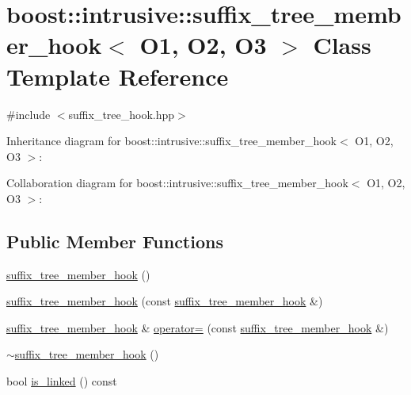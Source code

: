 \hypertarget{classboost_1_1intrusive_1_1suffix__tree__member__hook}{}\section{boost\+:\+:intrusive\+:\+:suffix\+\_\+tree\+\_\+member\+\_\+hook$<$ O1, O2, O3 $>$ Class Template Reference}
\label{classboost_1_1intrusive_1_1suffix__tree__member__hook}


{\ttfamily \#include $<$suffix\+\_\+tree\+\_\+hook.\+hpp$>$}



Inheritance diagram for boost\+:\+:intrusive\+:\+:suffix\+\_\+tree\+\_\+member\+\_\+hook$<$ O1, O2, O3 $>$\+:


Collaboration diagram for boost\+:\+:intrusive\+:\+:suffix\+\_\+tree\+\_\+member\+\_\+hook$<$ O1, O2, O3 $>$\+:
\subsection*{Public Member Functions}
\begin{DoxyCompactItemize}
\item 
\hyperlink{classboost_1_1intrusive_1_1suffix__tree__member__hook_ab13f7e7c4cf841123d772121aeac5e0d}{suffix\+\_\+tree\+\_\+member\+\_\+hook} ()
\item 
\hyperlink{classboost_1_1intrusive_1_1suffix__tree__member__hook_abd901fd867e5b045ead9d2d8eddc8578}{suffix\+\_\+tree\+\_\+member\+\_\+hook} (const \hyperlink{classboost_1_1intrusive_1_1suffix__tree__member__hook}{suffix\+\_\+tree\+\_\+member\+\_\+hook} \&)
\item 
\hyperlink{classboost_1_1intrusive_1_1suffix__tree__member__hook}{suffix\+\_\+tree\+\_\+member\+\_\+hook} \& \hyperlink{classboost_1_1intrusive_1_1suffix__tree__member__hook_a94b9cfe8b749b69dfb56c28adf0e477d}{operator=} (const \hyperlink{classboost_1_1intrusive_1_1suffix__tree__member__hook}{suffix\+\_\+tree\+\_\+member\+\_\+hook} \&)
\item 
\hyperlink{classboost_1_1intrusive_1_1suffix__tree__member__hook_a573fac96e555f2a28b3b01e24c445e3b}{$\sim$suffix\+\_\+tree\+\_\+member\+\_\+hook} ()
\item 
bool \hyperlink{classboost_1_1intrusive_1_1suffix__tree__member__hook_ae37983c6aa54b43839bccb8b97dec516}{is\+\_\+linked} () const
\end{DoxyCompactItemize}



